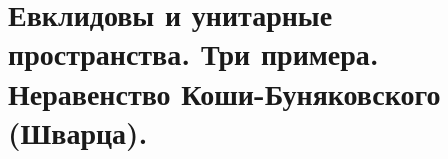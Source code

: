 \section{
    Евклидовы и унитарные пространства. Три примера. Неравенство Коши-Буняковского (Шварца).
}




\newpage





\newpage





\newpage



